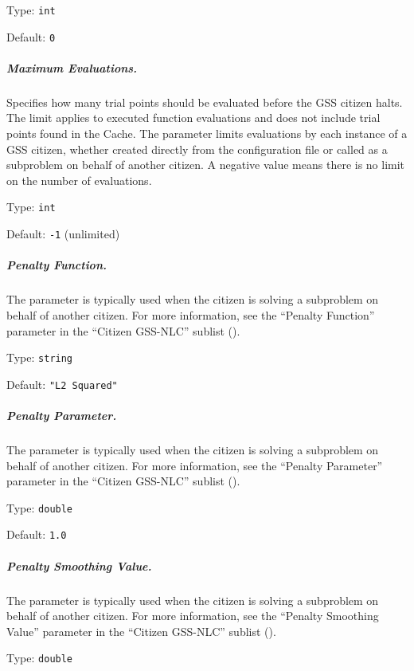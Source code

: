 \hspace{0.2in}
Type: {\tt int}

\hspace{0.2in}
Default: {\tt 0}

\subparagraph{Maximum Evaluations.}  \label{param:GS-maxeval}
Specifies how many trial points should be evaluated before the GSS citizen
halts.  The limit applies to executed function evaluations and does not include
trial points found in the Cache.
The parameter limits evaluations by each instance of a GSS citizen, whether
created directly from the configuration file or called as a subproblem on
behalf of another citizen.
A negative value means there is no limit on the number of evaluations.

\hspace{0.2in}
Type: {\tt int}

\hspace{0.2in}
Default: {\tt -1} (unlimited)

\subparagraph{Penalty Function.}  \label{param:GS-penfn}
The parameter is typically used when the citizen is solving a
subproblem on behalf of another citizen.  For more information, see the
``Penalty Function'' parameter in the ``Citizen GSS-NLC'' sublist
().

\hspace{0.2in}
Type: {\tt string}

\hspace{0.2in}
Default: {\tt "L2 Squared"}

\subparagraph{Penalty Parameter.}  \label{param:GS-penparam}
The parameter is typically used when the citizen is solving a
subproblem on behalf of another citizen.  For more information, see the
``Penalty Parameter'' parameter in the ``Citizen GSS-NLC'' sublist
().

\hspace{0.2in}
Type: {\tt double}

\hspace{0.2in}
Default: {\tt 1.0}

\subparagraph{Penalty Smoothing Value.}  \label{param:GS-pensmooth}
The parameter is typically used when the citizen is solving a
subproblem on behalf of another citizen.  For more information, see the
``Penalty Smoothing Value'' parameter in the ``Citizen GSS-NLC'' sublist
().

\hspace{0.2in}
Type: {\tt double}


